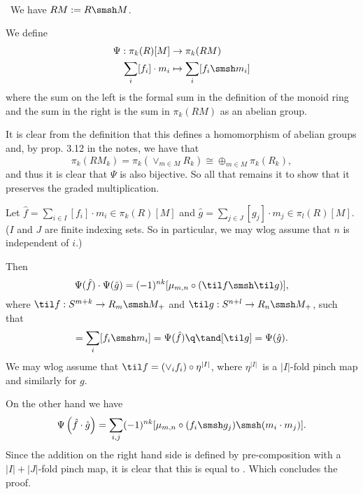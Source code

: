 

\DeclareMathOperator\map{map}


\mmaketitle

\begin{exercise}[1]\ 
\end{exercise}

\begin{exercise}[2]\ 
We have $RM := R \smsh M$.

We define 
\begin{align*}
\Psi : \pi_k(R)[M] &\to \pi_k(RM) \\
\sum_i [f_i] \cdot m_i &\mapsto \sum_i [f_i \smsh m_i]
\end{align*}
where the sum on the left is the formal sum in the definition of the
monoid ring and the sum in the right is the sum in $\pi_k(RM)$ as an abelian
group.

It is clear from the definition that this defines a homomorphism of abelian
groups and, by prop. 3.12 in the notes, we have that 
\[ \pi_k(RM_k) = \pi_k(\vee_{m\in M} R_k) \cong \oplus_{m\in M} \pi_k(R_k), \]
and thus it is clear that $\Psi$ is also bijective. 
So all that remains it to show that it preserves the graded multiplication.

Let $\hat f = \sum_{i\in I} [f_i] \cdot m_i \in \pi_k(R)[M]$ and $\hat g =
\sum_{j\in J} [g_j] \cdot m_j \in \pi_l(R)[M]$. ($I$ and $J$ are finite indexing
sets. So in particular, we may wlog assume that $n$ is independent of $i$.)

Then 
\begin{equation}
\label{eq:5.2.a}
\Psi(\hat f) \cdot \Psi(\hat g) = (-1)^{nk} [\mu_{m,n} \circ (\til f
\smsh \til g)], 
\end{equation}
where $\til f: S^{m+k} \to R_m \smsh M_+$ and $\til g: S^{n+l} \to R_n \smsh
M_+$, such that 
\begin{equation*}
[\til f] = \sum_i [f_i \smsh m_i] = \Psi(\hat f) \q\tand 
[\til g] = \Psi(\hat g).
\end{equation*}
We may wlog assume that $\til f = (\vee_i f_i) \circ \eta^{|I|}$, where $\eta^{|I|}$ is a
$|I|$-fold pinch map and similarly for $g$.

On the other hand we have 
\[ \Psi\left(\hat f \cdot \hat g\right) = \sum_{i,j} (-1)^{nk} [\mu_{m,n} \circ (f_i \smsh
g_j) \smsh (m_i \cdot m_j)]. \] 
Since the addition on the right hand side is defined by pre-composition with a
$|I|+|J|$-fold pinch map, it is clear that this is equal to .
Which concludes the proof.
\end{exercise}


